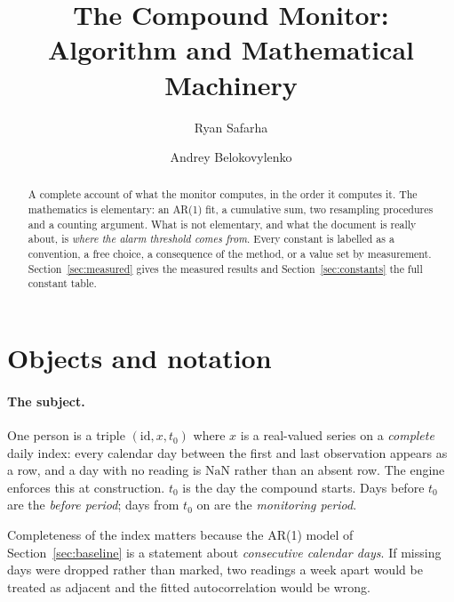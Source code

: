 \documentclass{article}
\title{The Compound Monitor:\\ Algorithm and Mathematical Machinery}
\author{Ryan Safarha \and Andrey Belokovylenko}
\date{}
\theoremstyle{plain}
\theoremstyle{definition}
\theoremstyle{remark}
\numberwithin{equation}{section}
\begin{document}
\maketitle

\begin{abstract}
\noindent
A complete account of what the monitor computes, in the order it computes it.
The mathematics is elementary: an AR(1) fit, a cumulative sum, two resampling
procedures and a counting argument. What is not elementary, and what the
document is really about, is \emph{where the alarm threshold comes from}. Every
constant is labelled as a convention, a free choice, a consequence of the
method, or a value set by measurement. Section~\ref{sec:measured} gives the
measured results and Section~\ref{sec:constants} the full constant table.
\end{abstract}

\tableofcontents

\section{Objects and notation}

\paragraph{The subject.} One person is a triple $(\mathrm{id}, x, t_0)$ where
$x$ is a real-valued series on a \emph{complete} daily index: every calendar
day between the first and last observation appears as a row, and a day with no
reading is $\mathrm{NaN}$ rather than an absent row. The engine enforces this
at construction. $t_0$ is the day the compound starts. Days before $t_0$ are
the \emph{before period}; days from $t_0$ on are the \emph{monitoring period}.

Completeness of the index matters because the AR(1) model of
Section~\ref{sec:baseline} is a statement about \emph{consecutive calendar
days}. If missing days were dropped rather than marked, two readings a week
apart would be treated as adjacent and the fitted autocorrelation would be
wrong.
\end{document}
